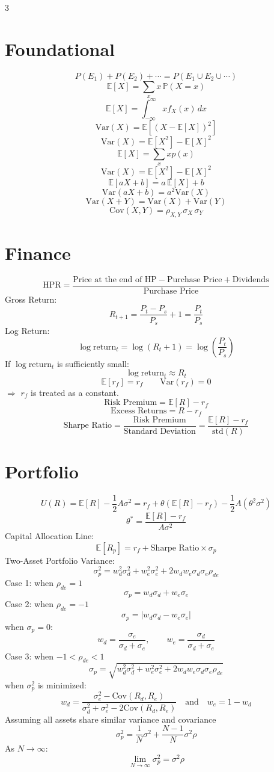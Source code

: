 \documentclass[10pt,a4paper]{article}
\begin{document}
\tiny  %

\begin{multicols}{3}

\section*{Foundational}
\[
P(E_1) + P(E_2) + \cdots = P(E_1 \cup E_2 \cup \cdots)
\]
\[
\mathbb{E}[X] = \sum_x x \, \mathbb{P}(X = x)
\]
\[
\mathbb{E}[X] = \int_{-\infty}^{\infty} x f_X(x)\, dx
\]
\[
\mathrm{Var}(X) = \mathbb{E}\!\left[(X - \mathbb{E}[X])^2\right]
\]
\[
\mathrm{Var}(X) = \mathbb{E}[X^2] - \mathbb{E}[X]^2
\]
\[
\mathbb{E}[X] = \sum_x x p(x)
\]
\[
\mathrm{Var}(X) = \mathbb{E}[X^2] - \mathbb{E}[X]^2
\]
\[
\mathbb{E}[aX + b] = a\,\mathbb{E}[X] + b
\]
\[
\mathrm{Var}(aX + b) = a^2 \mathrm{Var}(X)
\]
\[
\mathrm{Var}(X + Y) = \mathrm{Var}(X) + \mathrm{Var}(Y)
\]
\[
\mathrm{Cov}(X,Y) = \rho_{X,Y} \, \sigma_X \, \sigma_Y
\]
\section*{Finance}
\[
\text{HPR} = \frac{\text{Price at the end of HP} - \text{Purchase Price} + \text{Dividends}}{\text{Purchase Price}}
\]
Gross Return:
\[
R_{t+1} = \frac{P_{t} - P_{s}}{P_{s}} + 1 = \frac{P_{t}}{P_{s}}
\]
Log Return:
\[
\log\mathrm{return}_t = \log(R_t + 1) = \log\left( \frac{P_t}{P_s} \right)
\]
If $\log\mathrm{return}_t$ is sufficiently small:
\[
\log\mathrm{return}_t \approx R_t
\]
\[
\mathbb{E}[r_f] = r_f \qquad \mathrm{Var}(r_f) = 0
\]
$\Rightarrow$ $r_f$ is treated as a constant.
\[
\text{Risk Premium} = \mathbb{E}[R] - r_f
\]
\[
\text{Excess Returns} = R - r_f
\]
\[
\text{Sharpe Ratio} = \frac{\text{Risk Premium}}{\text{Standard Deviation}} = \frac{\mathbb{E}[R] - r_f}{\mathrm{std}(R)}
\]
\section*{Portfolio}
\[
U(R) = \mathbb{E}[R] - \frac{1}{2} A \sigma^2 = r_f + \theta \left( \mathbb{E}[R] - r_f \right) - \frac{1}{2} A (\theta^2 \sigma^2)
\]
\[
\theta^* = \frac{\mathbb{E}[R] - r_f}{A \sigma^2}
\]
Capital Allocation Line:
\[
\mathbb{E}[R_p] = r_f + \text{Sharpe Ratio} \times \sigma_p
\]
Two-Asset Portfolio Variance:
\[
\sigma_p^2 = w_d^2 \sigma_d^2 + w_e^2 \sigma_e^2 + 2 w_d w_e \sigma_d \sigma_e \rho_{de}
\]
Case 1: when $\rho_{de} = 1$
\[
\sigma_p = w_d \sigma_d + w_e \sigma_e
\]
Case 2: when $\rho_{de} = -1$
\[
\sigma_p = |w_d \sigma_d - w_e \sigma_e|
\]
when $\sigma_p = 0$:
\[
w_d = \frac{\sigma_e}{\sigma_d + \sigma_e}, \qquad w_e = \frac{\sigma_d}{\sigma_d + \sigma_e}
\]
Case 3: when $-1 < \rho_{de} < 1$
\[
\sigma_p = \sqrt{w_d^2 \sigma_d^2 + w_e^2 \sigma_e^2 + 2 w_d w_e \sigma_d \sigma_e \rho_{de}}
\]
when $\sigma_p^2$ is minimized:
\[
w_d = \frac{\sigma_e^2 - \mathrm{Cov}(R_d, R_e)}{\sigma_d^2 + \sigma_e^2 - 2 \mathrm{Cov}(R_d, R_e)} \quad \text{and} \quad w_e = 1 - w_d
\]
Assuming all assets share similar variance and covariance
\[
\sigma_p^2 = \frac{1}{N} \sigma^2 + \frac{N-1}{N} \sigma^2 \rho
\]
As \(N \to \infty\):
\[
\lim_{N \to \infty} \sigma_p^2 = \sigma^2 \rho
\]

\end{multicols}
\end{document}
